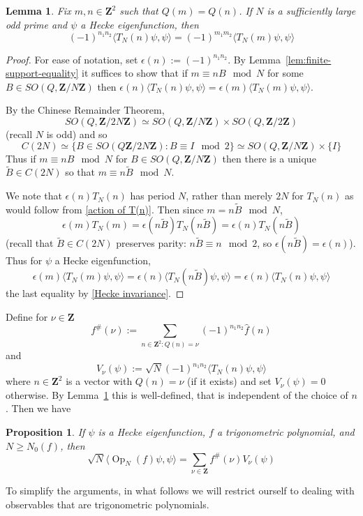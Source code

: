 \documentclass[12pt]{amsart}
\newtheorem{lem}[thm]{Lemma}%
\newtheorem{prop}[thm]{Proposition}%
\theoremstyle{plain}
\newcommand{\Z}{{\mathbf Z}}
\newcommand{\TN}{T_N}  %
\newcommand{\OPN}{\operatorname{Op}_N}
\newcommand{\torusN}{C(2N)}%
\renewcommand{\^}{\widehat}
\newcommand{\fs}{f^\#}
\newcommand{\vnn}{\nu}
\begin{document}
\begin{lem}\label{lem:hyperbola} 
Fix $m,n\in \Z^2$ such that $Q(m)=Q(n)$. 
If $N$ is a sufficiently large odd prime and  $\psi$  a Hecke
eigenfunction, then 
$$
(-1)^{n_1 n_2}\langle \TN(n)\psi,\psi \rangle = 
(-1)^{m_1 m_2}\langle \TN(m)\psi,\psi \rangle 
$$
\end{lem}
\begin{proof}
For ease of notation, set $\epsilon(n):=(-1)^{n_1 n_2}$. 
By Lemma~\ref{lem:finite-support-equality} it suffices to show 
that if $m\equiv nB \mod N$ for
some $B\in SO(Q,\Z/N\Z)$ then 
$\epsilon(n)\langle \TN(n)\psi,\psi \rangle =  
\epsilon(m)\langle \TN(m)\psi,\psi \rangle$.  

By  the Chinese Remainder Theorem, 
$$
SO(Q,\Z/2N\Z)\simeq
SO(Q,\Z/N\Z)\times SO(Q,\Z/2\Z)
$$ 
(recall $N$ is odd) and so 
$$
\torusN\simeq\{B\in SO(Q\Z/2N\Z):B\equiv I\mod 2 \} \simeq 
SO(Q,\Z/N\Z)\times \{I\}
$$
Thus if $m\equiv nB \mod N$ for $B\in SO(Q,\Z/N\Z)$ then there is a
unique $\tilde B\in \torusN$ so that $m\equiv n\tilde B \mod N$. 


We  note that $\epsilon(n)\TN(n)$ has period $N$, rather than
merely $2N$ for $\TN(n)$ as would follow from \eqref{action of T(n)}. 
Then since $m=n\tilde B \mod N$, 
$$
\epsilon(m)\TN(m) = \epsilon(n\tilde B) \TN(n\tilde B) =
\epsilon(n)\TN(n\tilde B)
$$
(recall that $\tilde B\in\torusN$ preserves parity: $n\tilde B\equiv
n\mod 2$, so $\epsilon(n\tilde B) = \epsilon(n)$). 
Thus for $\psi$ a Hecke eigenfunction, 
$$
\epsilon(m)\langle \TN(m)\psi,\psi\rangle = 
\epsilon(n)\langle \TN(n\tilde B)\psi,\psi\rangle = 
\epsilon(n)\langle \TN(n)\psi,\psi\rangle
$$
the last equality by \eqref{Hecke invariance}.  
\end{proof}

Define for $\vnn\in \Z$ 
$$
\fs(\vnn):= \sum_{n\in \Z^2: Q(n)=\vnn} (-1)^{n_1 n_2}\^f(n)
$$
and 
\begin{equation}
\label{eq:V-definition}
V_\vnn(\psi):= \sqrt{N} (-1)^{n_1n_2} \langle\TN(n)\psi,\psi \rangle
\end{equation}
where  $n\in \Z^2$ is a vector with $Q(n) = \vnn$ (if it exists)
and set $V_\vnn(\psi) = 0$ otherwise. By Lemma~\ref{lem:hyperbola} this
is well-defined, that is independent of the choice of $n$. 
Then we have 
\begin{prop}\label{prop:rewrite}
If $\psi$ is a Hecke eigenfunction, $f$ a trigonometric polynomial, 
and $N\geq N_0(f)$, then 
$$
\sqrt{N} \langle\OPN(f)\psi,\psi \rangle  = 
\sum_{\vnn\in \Z} \fs(\vnn) V_\vnn(\psi)
$$
\end{prop} 
To simplify the arguments, in what follows we will restrict ourself to
dealing with observables that are trigonometric polynomials. 
\end{document}
